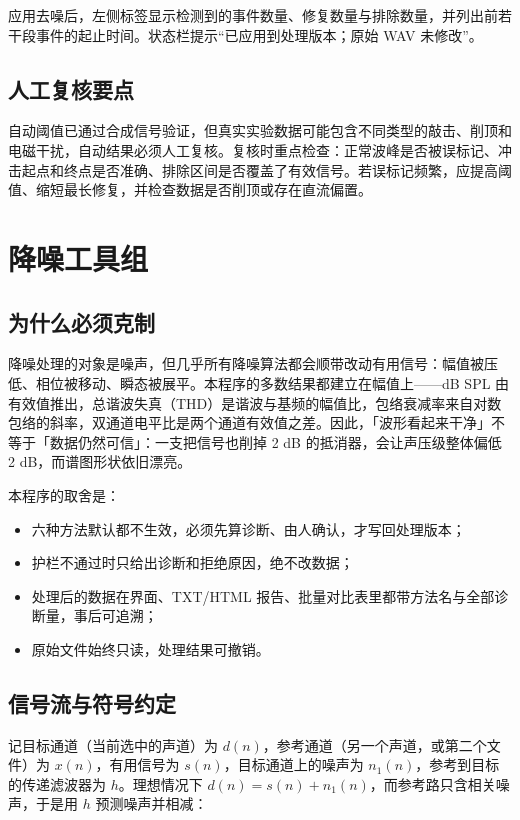 \documentclass[UTF8,a4paper,12pt,scheme=chinese]{ctexart}
\begin{document}
应用去噪后，左侧标签显示检测到的事件数量、修复数量与排除数量，并列出前若干段事件的起止时间。状态栏提示“已应用到处理版本；原始 WAV 未修改”。

\subsection{人工复核要点}

自动阈值已通过合成信号验证，但真实实验数据可能包含不同类型的敲击、削顶和电磁干扰，自动结果必须人工复核。复核时重点检查：正常波峰是否被误标记、冲击起点和终点是否准确、排除区间是否覆盖了有效信号。若误标记频繁，应提高阈值、缩短最长修复，并检查数据是否削顶或存在直流偏置。

\section{降噪工具组}

\subsection{为什么必须克制}

降噪处理的对象是噪声，但几乎所有降噪算法都会顺带改动有用信号：幅值被压低、相位被移动、瞬态被展平。本程序的多数结果都建立在幅值上——dB SPL 由有效值推出，总谐波失真（THD）是谐波与基频的幅值比，包络衰减率来自对数包络的斜率，双通道电平比是两个通道有效值之差。因此，「波形看起来干净」不等于「数据仍然可信」：一支把信号也削掉 2 dB 的抵消器，会让声压级整体偏低 2 dB，而谱图形状依旧漂亮。

本程序的取舍是：

\begin{itemize}[leftmargin=2em]
  \item 六种方法默认都不生效，必须先算诊断、由人确认，才写回处理版本；
  \item 护栏不通过时只给出诊断和拒绝原因，绝不改数据；
  \item 处理后的数据在界面、TXT/HTML 报告、批量对比表里都带方法名与全部诊断量，事后可追溯；
  \item 原始文件始终只读，处理结果可撤销。
\end{itemize}

\subsection{信号流与符号约定}

记目标通道（当前选中的声道）为 $d(n)$，参考通道（另一个声道，或第二个文件）为 $x(n)$，有用信号为 $s(n)$，目标通道上的噪声为 $n_1(n)$，参考到目标的传递滤波器为 $h$。理想情况下 $d(n)=s(n)+n_1(n)$，而参考路只含相关噪声，于是用 $h$ 预测噪声并相减：
\end{document}
